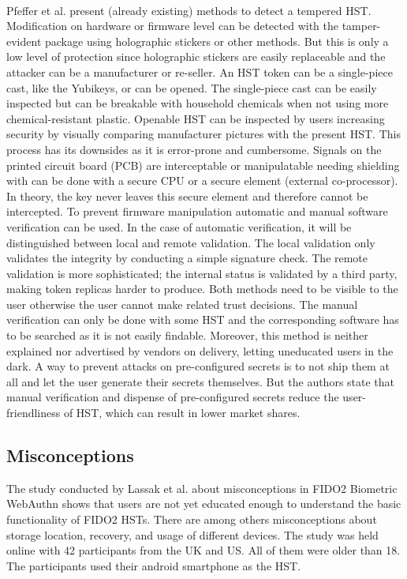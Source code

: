 \documentclass[runningheads]{llncs}
\begin{document}
\paragraph{}
Pfeffer et al. present (already existing) methods to detect a tempered HST.
Modification on hardware or firmware level can be detected with the tamper-evident package using holographic stickers or other methods. But this is only a low level of protection since holographic stickers are easily replaceable and the attacker can be a manufacturer or re-seller. An HST token can be a single-piece cast, like the Yubikeys, or can be opened. The single-piece cast can be easily inspected but can be breakable with household chemicals when not using more chemical-resistant plastic. Openable HST can be inspected by users increasing security by visually comparing manufacturer pictures with the present HST. This process has its downsides as it is error-prone and cumbersome. Signals on the printed circuit board (PCB) are interceptable or manipulatable needing shielding with can be done with a secure CPU or a secure element (external co-processor). In theory, the key never leaves this secure element and therefore cannot be intercepted. To prevent firmware manipulation automatic and manual software verification can be used. In the case of automatic verification, it will be distinguished between local and remote validation. The local validation only validates the integrity by conducting a simple signature check. The remote validation is more sophisticated; the internal status is validated by a third party, making token replicas harder to produce. Both methods need to be visible to the user otherwise the user cannot make related trust decisions.
The manual verification can only be done with some HST and the corresponding software has to be searched as it is not easily findable. Moreover, this method is neither explained nor advertised by vendors on delivery, letting uneducated users in the dark. A way to prevent attacks on pre-configured secrets is to not ship them at all and let the user generate their secrets themselves. But the authors state that manual verification and dispense of pre-configured secrets reduce the user-friendliness of HST, which can result in lower market shares. \cite{272198}

\subsection{Misconceptions}
The study conducted by Lassak et al.\cite{274547} about misconceptions in FIDO2 Biometric WebAuthn shows that users are not yet educated enough to understand the basic functionality of FIDO2 HSTs. There are among others misconceptions about storage location, recovery, and usage of different devices. The study was held online with 42 participants from the UK and US. All of them were older than 18. The participants used their android smartphone as the HST.
\end{document}
